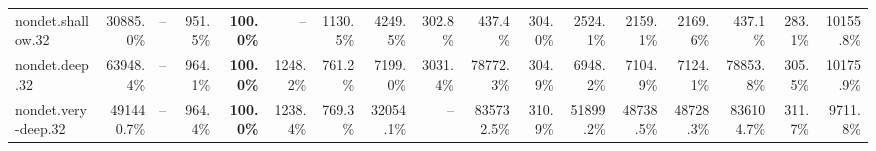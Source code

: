 \documentclass[varwidth,border=2pt]{standalone}
\begin{document}
\begin{center}
{\begin{tabular}{lrrrrrrrrrrrrrrrr}
nondet.shallow.32 & 30885.0\% & -- & 951.5\% & \textbf{100.0\%} & -- & 1130.5\% & 4249.5\% & 302.8\% & 437.4\% & 304.0\% & 2524.1\% & 2159.1\% & 2169.6\% & 437.1\% & 283.1\% & 10155.8\% \\
nondet.deep.32 & 63948.4\% & -- & 964.1\% & \textbf{100.0\%} & 1248.2\% & 761.2\% & 7199.0\% & 3031.4\% & 78772.3\% & 304.9\% & 6948.2\% & 7104.9\% & 7124.1\% & 78853.8\% & 305.5\% & 10175.9\% \\
nondet.very-deep.32 & 491440.7\% & -- & 964.4\% & \textbf{100.0\%} & 1238.4\% & 769.3\% & 32054.1\% & -- & 835732.5\% & 310.9\% & 51899.2\% & 48738.5\% & 48728.3\% & 836104.7\% & 311.7\% & 9711.8\% \\
\bottomrule
\end{tabular}
}
\end{center}
\end{document}
